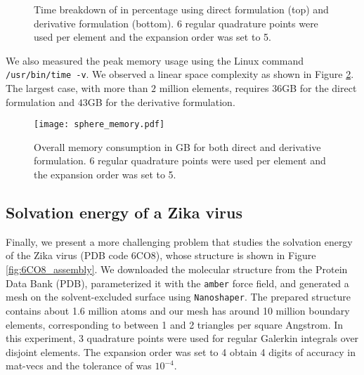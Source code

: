 \begin{figure}%
    \begin{subfigure}{\columnwidth}
        \centering
    \end{subfigure}

    \begin{subfigure}{\columnwidth}
        \centering
    \end{subfigure}

    \caption{Time breakdown of \gmres in percentage using direct formulation (top) and derivative formulation (bottom).
    6 regular quadrature points were used per element and the \fmm expansion order was set to 5.}
    \label{fig:sphere_gmres}
\end{figure}

We also measured the peak memory usage using the Linux command \texttt{/usr/bin/time -v}.
We observed a linear space complexity as shown in Figure \ref{fig:sphere_memory}.
The largest case, with more than $2$ million elements, requires $36$GB for the direct formulation and $43$GB for the derivative formulation.

\begin{figure}%
    \centering
    \texttt{[image: sphere\_memory.pdf]} 
    \caption{Overall memory consumption in GB for both direct and derivative formulation.
    6 regular quadrature points were used per element and the \fmm expansion order was set to 5.}
    \label{fig:sphere_memory}
\end{figure}

\subsection{Solvation energy of a Zika virus} \label{result_zika}

Finally, we present a more challenging problem that studies the solvation energy of the Zika virus (PDB code 6CO8), whose structure \cite{sevvana2018refinement} is shown in Figure \ref{fig:6CO8_assembly}.
We downloaded the molecular structure from the Protein Data Bank (PDB), parameterized it with the \texttt{amber} force field, and generated a mesh on the solvent-excluded surface using \texttt{Nanoshaper}.
The prepared structure contains about 1.6 million atoms and our mesh has around 10 million boundary elements, corresponding to between 1 and 2 triangles per square Angstrom.
In this experiment, 3 quadrature points were used for regular Galerkin integrals over disjoint elements.
The \fmm expansion order was set to 4 obtain 4 digits of accuracy in mat-vecs and the tolerance of \gmres was $10^{-4}$.

